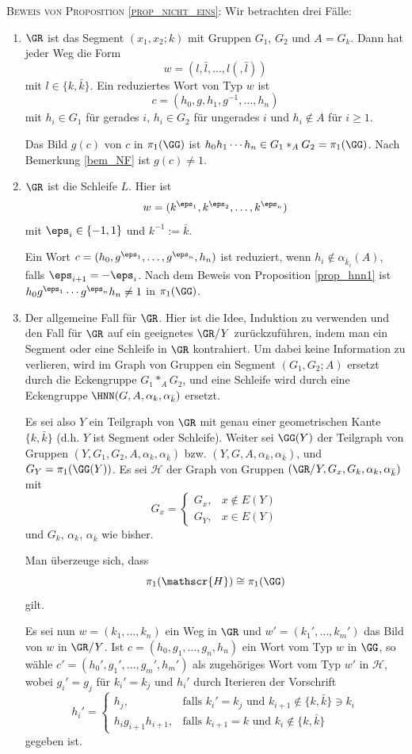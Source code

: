 \textsc{Beweis von Proposition \ref{prop_nicht_eins}:}
Wir betrachten drei Fälle:
\begin{enumerate}
\item
$\GR$ ist das Segment $(x_1,x_2;k)$ mit Gruppen
$G_1$, $G_2$ und $A=G_k$. Dann hat jeder Weg die Form
\[
w = (l,\bar{l},\ldots,l(,\bar{l}))
\]
mit $l\in\{ k, \bar{k} \}$.
Ein reduziertes Wort von Typ $w$ ist
\[
c = (h_0,g,h_1,g^{-1},\ldots,h_n)
\]
mit $h_i\in G_1$ für gerades $i$, $h_i\in G_2$ für ungerades $i$
und $h_i\not\in A$ für $i\geq 1$.

Das Bild $g(c)$ von $c$ in $\pi_1(\GG)$ ist
$h_0 h_1\cdots h_n \in G_1 *_A G_2=\pi_1(\GG)$.
Nach Bemerkung \ref{bem_NF} ist $g(c)\neq 1$.

\item
$\GR$ ist die Schleife $L$. Hier ist
\[
w = (k^{\eps_1},k^{\eps_2},\ldots,k^{\eps_n})
\]
mit $\eps_i\in\{-1,1\}$ und $k^{-1}:=\bar{k}$.

Ein Wort $c=(h_0,g^{\eps_1},\ldots,g^{\eps_n},h_n)$ ist reduziert,
wenn $h_i\not\in \alpha_{\bar{k}_i}(A)$, falls $\eps_{i+1}=-\eps_i$.
Nach dem Beweis von Proposition \ref{prop_hnn1} ist
$h_0 g^{\eps_1}\cdots g^{\eps_n}h_n\neq 1$ in $\pi_1(\GG)$.

\item
Der allgemeine Fall für $\GR$. Hier ist die Idee, Induktion
zu verwenden und den Fall für $\GR$ auf ein geeignetes $\GR/Y$
zurückzuführen, indem man ein Segment oder eine Schleife in $\GR$
kontrahiert. Um dabei keine Information zu verlieren, wird im
Graph von Gruppen ein Segment $(G_1,G_2;A)$ ersetzt durch
die Eckengruppe $G_1*_A G_2$, und eine Schleife wird durch eine
Eckengruppe $\HNN(G,A,\alpha_k,\alpha_{\bar{k}})$ ersetzt.

Es sei also $Y$ ein Teilgraph von $\GR$ mit genau einer geometrischen
Kante $\{k,\bar{k}\}$ (d.h. $Y$ ist Segment oder Schleife).
Weiter sei $\GG(Y)$ der Teilgraph von Gruppen
$(Y,G_1,G_2,A,\alpha_{k},\alpha_{\bar{k}})$ bzw.
$(Y,G,A,\alpha_{k},\alpha_{\bar{k}})$, und $G_Y=\pi_1(\GG(Y))$.
Es sei $\mathscr{H}$ der Graph von Gruppen
$(\GR/Y,G_x,G_k,\alpha_k,\alpha_{\bar{k}})$ mit
\[
G_x = \left\{
\begin{matrix}
G_x, & x\not\in E(Y) \\
G_Y, & x\in E(Y)
\end{matrix}\right.
\]
und $G_k$, $\alpha_k$, $\alpha_{\bar{k}}$ wie bisher.

Man überzeuge sich, dass
\[
\pi_1(\mathscr{H}) \cong \pi_1(\GG)
\]
gilt.

Es sei nun $w=(k_1,\ldots,k_n)$ ein Weg in $\GR$ und
$w'=(k_1',\ldots,k_m')$ das Bild von $w$ in $\GR/Y$.
Ist $c=(h_0,g_1,\ldots,g_n,h_n)$ ein Wort vom Typ $w$ in $\GG$,
so wähle
$c'=(h_0',g_1',\ldots,g_m',h_m')$ als zugehöriges Wort vom
Typ $w'$ in $\mathscr{H}$, wobei $g_i'=g_j$ für $k_i'=k_j$ und
$h_i'$ durch Iterieren der Vorschrift
\[
h_i' = \left\{
\begin{matrix}
h_j, &
\text{falls $k_i'=k_j$ und $k_{i+1}\not\in\{k,\bar{k}\}\ni k_i$}\\
h_i g_{i+1} h_{i+1}, &
\text{falls $k_{i+1}=k$ und $k_i\not\in\{k,\bar{k}\}$}
\end{matrix}\right.
\]
gegeben ist.


\end{enumerate}
